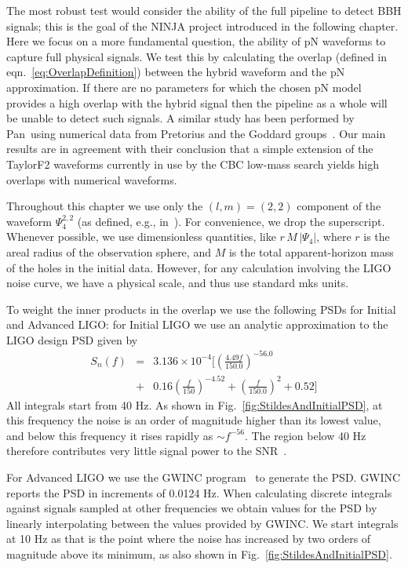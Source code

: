 The most robust test would consider the ability of the full pipeline
to detect BBH signals; this is the goal of the NINJA project
introduced in the following chapter.  Here we focus on a more
fundamental question, the ability of pN waveforms to capture full
physical signals.  We test this by calculating the overlap (defined in
eqn.~\ref{eq:OverlapDefinition}) between the hybrid waveform and the
pN approximation.  If there are no parameters for which the chosen pN
model provides a high overlap with the hybrid signal then the pipeline
as a whole will be unable to detect such signals.  A similar study has
been performed by Pan~\etal using numerical data from Pretorius and
the Goddard groups~\cite{Pan2007}.  Our main results are in agreement
with their conclusion that a simple extension of the TaylorF2
waveforms currently in use by the CBC low-mass search yields high
overlaps with numerical waveforms.

Throughout this chapter we use only the $(l,m)=(2,2)$ component of the
waveform $\Psi_{4}^{2,2}$ (as defined, e.g., in~\cite{Boyle2008a}).
For convenience, we drop the superscript.  Whenever possible, we use
dimensionless quantities, like $r\,M\,\lvert \Psi_{4} \rvert$, where
$r$ is the areal radius of the observation sphere, and $M$ is the
total apparent-horizon mass of the holes in the initial data.
However, for any calculation involving the LIGO noise curve, we have a
physical scale, and thus use standard mks units.  

To weight the inner products in the overlap we use the
following PSDs for Initial and Advanced LIGO: for Initial LIGO we use
an analytic approximation to the LIGO design PSD given by
\begin{eqnarray}
  S_n(f) &= &3.136 \times 10^{-4} \bigg[
  \left(\frac{ 4.49 f}{150.0}\right)^{-56.0} \nonumber \\
  &+ & 0.16 \left(\frac{f}{150}\right)^{-4.52}
  + \left(\frac{f}{150.0}\right)^2 + 0.52
  \bigg]
\end{eqnarray}
All integrals start from 40 Hz.  As shown in
Fig.~\ref{fig:StildesAndInitialPSD}, at this frequency the noise is an
order of magnitude higher than its lowest value, and below this
frequency it rises rapidly as $\sim f^{-56}$.  The region below 40 Hz
therefore contributes very little signal power to the
SNR~\cite{Abbott:2007xi}.  

For Advanced LIGO we use the GWINC program~\cite{AdvancedLIGONoise} to
generate the PSD.  GWINC reports the PSD in increments of 0.0124 Hz.
When calculating discrete integrals against signals sampled at other
frequencies we obtain values for the PSD by linearly interpolating
between the values provided by GWINC.  We start integrals at 10 Hz as
that is the point where the noise has increased by two orders of
magnitude above its minimum, as also shown in
Fig.~\ref{fig:StildesAndInitialPSD}.




